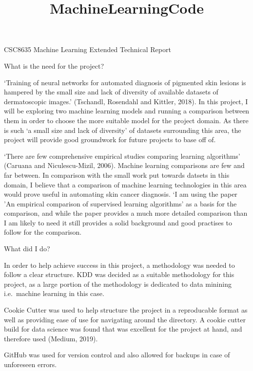 \documentclass[11pt]{article}
\title{MachineLearningCode}
\begin{document}
    
    
    \maketitle
    
    

    
    CSC8635 Machine Learning Extended Technical Report

What is the need for the project?

`Training of neural networks for automated diagnosis of pigmented skin
lesions is hampered by the small size and lack of diversity of available
datasets of dermatoscopic images.' (Tschandl, Rosendahl and Kittler,
2018). In this project, I will be exploring two machine learning models
and running a comparison between them in order to choose the more
suitable model for the project domain. As there is such `a small size
and lack of diversity' of datasets surrounding this area, the project
will provide good groundwork for future projects to base off of.

`There are few comprehensive empirical studies comparing learning
algorithms' (Caruana and Niculescu-Mizil, 2006). Machine learning
comparisons are few and far between. In comparison with the small work
put towards datsets in this domain, I believe that a comparison of
machine learning technologies in this area would prove useful in
automating skin cancer diagnosis. `I am using the paper 'An empirical
comparison of supervised learning algorithms' as a basis for the
comparison, and while the paper provides a much more detailed comparison
than I am likely to need it still provides a solid background and good
practises to follow for the comparison.

    What did I do?

In order to help achieve success in this project, a methodology was
needed to follow a clear structure. KDD was decided as a suitable
methodology for this project, as a large portion of the methodology is
dedicated to data minining i.e.~machine learning in this case.

Cookie Cutter was used to help structure the project in a reproducable
format as well as providing ease of use for navigating around the
directory. A cookie cutter build for data science was found that was
excellent for the project at hand, and therefore used (Medium, 2019).

GitHub was used for version control and also allowed for backups in case
of unforeseen errors.
\end{document}
